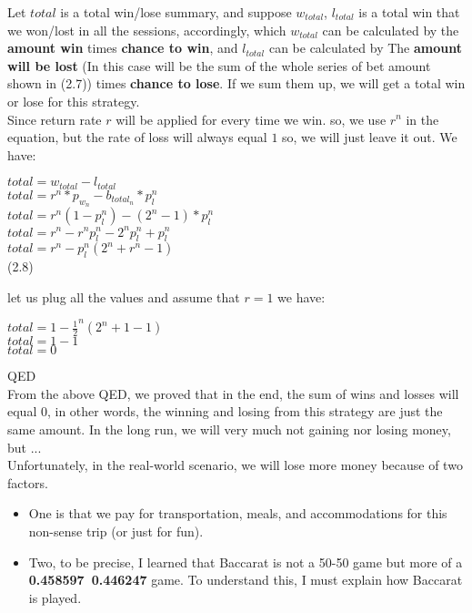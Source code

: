 \documentclass{article}
\begin{document}
Let $total$ is a total win/lose summary, and suppose $w_{total}$, $l_{total}$ is a total win that we won/lost in all the sessions, accordingly, which $w_{total}$ can be calculated by the \textbf{amount win} times \textbf{chance to win}, and $l_{total}$ can be calculated by The \textbf{amount will be lost} (In this case will be the sum of the whole series of bet amount shown in (2.7)) times \textbf{chance to lose}.  If we sum them up, we will get a total win or lose for this strategy.\\

Since return rate $r$ will be applied for every time we win. so, we use $r^n$ in the equation, but the rate of loss will always equal $1$ so, we will just leave it out.  We have:\par
\begin{center}
$total = w_{total}-l_{total}$\\
$total = r^n*p_{w_n} - b_{total_n}*p_l^n$\\
$total = r^n(1-p_l^n)-(2^n-1)*p_l^n$\\
$total = r^n-r^np_l^n-2^np_l^n+p_l^n$\\
$total = r^n-p_l^n(2^n+r^n-1)$\\
(2.8)
\end{center}
let us plug all the values and assume that $r=1$ we have:\par
\begin{center}
$total = 1-\frac{1}{2}^n(2^n+1-1)$\\
$total = 1-1$\\
$total=0$\\
\end{center}
QED\\

From the above QED, we proved that in the end, the sum of wins and losses will equal 0, in other words, the winning and losing from this strategy are just the same amount.  In the long run, we will very much not gaining nor losing money, but ...\\

Unfortunately, in the real-world scenario, we will lose more money because of two factors.
\begin{itemize}
\item One is that we pay for transportation, meals, and accommodations for this non-sense trip (or just for fun).
\item Two, to be precise, I learned that Baccarat is not a 50-50 game but more of a \textbf{0.458597~0.446247} game.  To understand this, I must explain how Baccarat is played.
\end{itemize}
\end{document}
